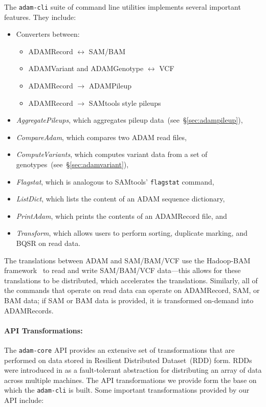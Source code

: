\documentclass{bioinfo}
\begin{document}
The \texttt{adam-cli} suite of command line utilities implements several important features. They include:

\begin{itemize}
\item Converters between:
\begin{itemize}
\item ADAMRecord $\leftrightarrow$ SAM/BAM
\item ADAMVariant and ADAMGenotype $\leftrightarrow$ VCF
\item ADAMRecord $\rightarrow$ ADAMPileup
\item ADAMRecord $\rightarrow$ SAMtools style pileups 
\end{itemize}
\item \textit{AggregatePileups}, which aggregates pileup data~(see~\S\ref{sec:adampileup}),
\item \textit{CompareAdam}, which compares two ADAM read files,
\item \textit{ComputeVariants}, which computes variant data from a set of genotypes~(see~\S\ref{sec:adamvariant}),
\item \textit{Flagstat}, which is analogous to SAMtools' \texttt{flagstat} command,
\item \textit{ListDict}, which lists the content of an ADAM sequence dictionary,
\item \textit{PrintAdam}, which prints the contents of an ADAMRecord file, and
\item \textit{Transform}, which allows users to perform sorting, duplicate marking, and BQSR on read data.
\end{itemize}

The translations between ADAM and SAM/BAM/VCF use the Hadoop-BAM framework~\citep[see][]{niemenmaa12} to read and write SAM/BAM/VCF data---this allows for these
translations to be distributed, which accelerates the translations. Similarly, all of the commands that operate on read data can operate on ADAMRecord, SAM, or BAM data;
if SAM or BAM data is provided, it is transformed on-demand into ADAMRecords.

\paragraph{API Transformations:}
\label{sec:api-transforms}

The \texttt{adam-core} API provides an extensive set of transformations that are performed on data stored in Resilient Distributed Dataset~(RDD) form. RDDs were introduced
in \citet{zaharia12} as a fault-tolerant abstraction for distributing an array of data across multiple machines. The API transformations we provide form the base on which the
\texttt{adam-cli} is built. Some important transformations provided by our API include:
\end{document}

